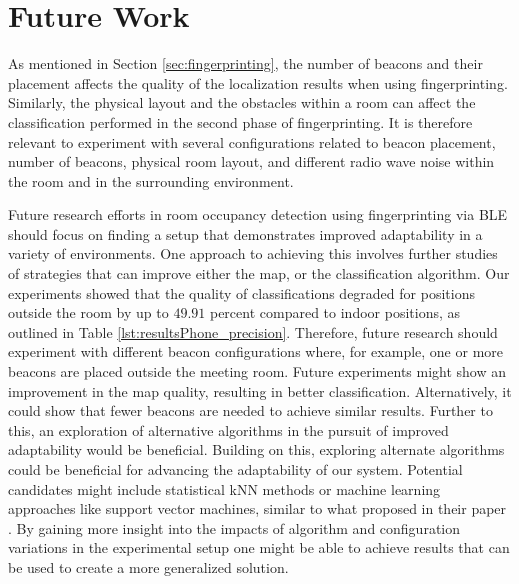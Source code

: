 \chapter{Future Work}
As mentioned in Section \ref{sec:fingerprinting}, the number of beacons and their placement affects the quality of the localization results when using fingerprinting. 
Similarly, the physical layout and the obstacles within a room can affect the classification performed in the second phase of fingerprinting. 
It is therefore relevant to experiment with several configurations related to beacon placement, number of beacons, physical room layout, and different radio wave noise within the room and in the surrounding environment. 

Future research efforts in room occupancy detection using fingerprinting via BLE should focus on finding a setup that demonstrates improved adaptability in a variety of environments.
One approach to achieving this involves further studies of strategies that can improve either the map, or the classification algorithm.
Our experiments showed that the quality of classifications degraded for positions outside the room by up to $49.91$ percent compared to indoor positions, as outlined in Table \ref{lst:resultsPhone_precision}.
Therefore, future research should experiment with different beacon configurations where, for example, one or more beacons are placed outside the meeting room. 
Future experiments might show an improvement in the map quality, resulting in better classification. Alternatively, it could show that fewer beacons are needed to achieve similar results. 
Further to this, an exploration of alternative algorithms in the pursuit of improved adaptability would be beneficial.
Building on this, exploring alternate algorithms could be beneficial for advancing the adaptability of our system.
Potential candidates might include statistical kNN methods or machine learning approaches like support vector machines, similar to what \citeauthor{ble_kneares_neural} proposed in their paper \cite{ble_kneares_neural}. 
By gaining more insight into the impacts of algorithm and configuration variations in the experimental setup one might be able to achieve results that can be used to create a more generalized solution.

